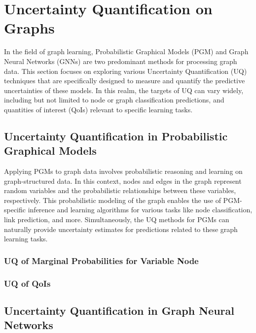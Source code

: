 \section{Uncertainty Quantification on Graphs}
In the field of graph learning, Probabilistic Graphical Models (PGM) and Graph Neural Networks (GNNs) are two predominant methods for processing graph data. 
This section focuses on exploring various Uncertainty Quantification (UQ) techniques that are specifically designed to measure and quantify the predictive uncertainties of these models. 
In this realm, the targets of UQ can vary widely, including but not limited to node or graph classification predictions, and quantities of interest (QoIs) relevant to specific learning tasks. 
\subsection{Uncertainty Quantification in Probabilistic Graphical Models}

Applying PGMs to graph data involves probabilistic reasoning and learning on graph-structured data. 
In this context, nodes and edges in the graph represent random variables and the probabilistic relationships between these variables, respectively. 
This probabilistic modeling of the graph enables the use of PGM-specific inference and learning algorithms for various tasks like node classification, link prediction, and more. 
Simultaneously, the UQ methods for PGMs can naturally provide uncertainty estimates for predictions related to these graph learning tasks. 

\subsubsection{UQ of Marginal Probabilities for Variable Node} 

\subsubsection{UQ of QoIs}
\subsection{Uncertainty Quantification in Graph Neural Networks}
